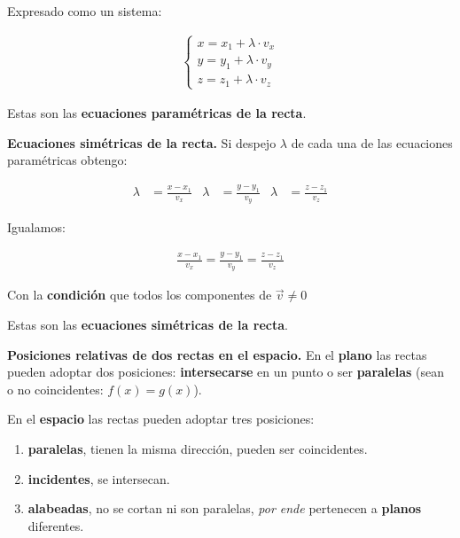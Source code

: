 \documentclass{article}
\begin{document}
Expresado como un sistema:

\begin{align*}
    \begin{cases}
        x = x_1 + \lambda \cdot v_x \\
        y = y_1 + \lambda \cdot v_y \\
        z = z_1 + \lambda \cdot v_z
    \end{cases}
\end{align*}

Estas son las \textbf{ecuaciones paramétricas de la recta}.

\textbf{Ecuaciones simétricas de la recta.} Si despejo \(\lambda\) de cada una
de las ecuaciones paramétricas obtengo:

\begin{align*}
    \lambda & = \frac{x - x_1}{v_x} & \lambda & = \frac{y - y_1}{v_y} & \lambda & = \frac{z - z_1}{v_z}
\end{align*}

Igualamos:

\begin{align*}
    \frac{x - x_1}{v_x} = \frac{y - y_1}{v_y} = \frac{z - z_1}{v_z}
\end{align*}

Con la \textbf{condición} que todos los componentes de \(\vec{v} \neq 0\)

Estas son las \textbf{ecuaciones simétricas de la recta}.

\textbf{Posiciones relativas de dos rectas en el espacio.} En el \textbf{plano}
las rectas pueden adoptar dos posiciones: \textbf{intersecarse} en un punto o
ser \textbf{paralelas} (sean o no coincidentes: \(f(x) = g(x)\)).

En el \textbf{espacio} las rectas pueden adoptar tres posiciones:

\begin{enumerate}
    \item \textbf{paralelas}, tienen la misma dirección, pueden ser
          coincidentes.
    \item \textbf{incidentes}, se intersecan.
    \item \textbf{alabeadas}, no se cortan ni son paralelas, \textit{por ende}
          pertenecen a \textbf{planos} diferentes.
\end{enumerate}
\end{document}
